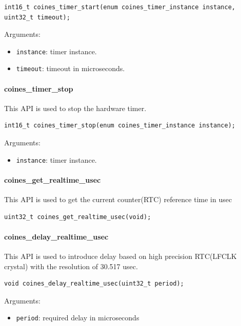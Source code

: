 \begin{lstlisting}
int16_t coines_timer_start(enum coines_timer_instance instance, uint32_t timeout);
\end{lstlisting}

Arguments:
\begin{itemize}
	\item \texttt{instance}: timer instance.
	\item \texttt{timeout}: timeout in microseconds.
\end{itemize}

\paragraph{coines\_timer\_stop}
 This API is used to stop the  hardware timer.
 
\begin{lstlisting}
int16_t coines_timer_stop(enum coines_timer_instance instance);
\end{lstlisting}

Arguments:
\begin{itemize}
	\item \texttt{instance}: timer instance.
\end{itemize}

\paragraph{coines\_get\_realtime\_usec}
This API is used to get the current counter(RTC) reference time in usec

\begin{lstlisting}
uint32_t coines_get_realtime_usec(void);
\end{lstlisting}

\paragraph{coines\_delay\_realtime\_usec}
This API is used to introduce delay based on high precision RTC(LFCLK crystal) with the resolution of 30.517 usec.

\begin{lstlisting}
void coines_delay_realtime_usec(uint32_t period);
\end{lstlisting}

Arguments:
\begin{itemize}
	\item \texttt{period}: required delay in microseconds 
\end{itemize}

